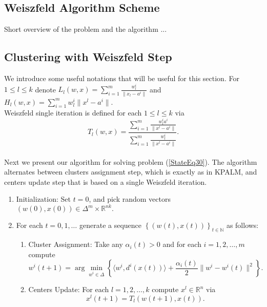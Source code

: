 \documentclass[11pt]{article}
\numberwithin{equation}{section}
\begin{document}
\subsection{Weiszfeld Algorithm Scheme}
Short overview of the problem and the algorithm ...

\subsection{Clustering with Weiszfeld Step}

We introduce some useful notations that will be useful for this section. 
For $1 \leq l \leq k$ denote $L_l(w,x)= \sum\limits_{i=1}^{m}\frac{w^i_l}{\|x_l - a^i\|}$ and $H_l(w,x)= \sum\limits_{i=1}^{m} w^i_l \|x^l - a^i\|$. \\
Weiszfeld single iteration is defined for each $1 \leq l \leq k$ via
\begin{equation}
T_l(w,x) = \frac{\sum\limits_{i=1}^{m}\frac{w^i_la^i}{\|x^l - a^i\|}}{\sum\limits_{i=1}^{m}\frac{w^i_l}{\|x^l - a^i\|}} . \label{StateEq31}
\end{equation} \\
Next we present our algorithm for solving problem (\ref{StateEq30}).  The algorithm alternates between clusters assignment step, which is exactly as in KPALM, and centers update step that is based on a single Weiszfeld iteration.

\begin{enumerate}[(1)]
	\item Initialization: Set $t=0$, and pick random vectors $(w(0),x(0)) \in \Delta^m \times \mathbb{R}^{nk} .$

	\item For each $t=0,1, \ldots$ generate a sequence $\left\lbrace(w(t),x(t))\right\rbrace_{t \in \mathbb{N}}$ as follows:
	\begin{enumerate}[(2.1)]
		\item Cluster Assignment: Take any $\alpha_i(t) > 0$ and for each $i=1, 2, \ldots ,m$ compute
		\begin{equation}
			w^i(t+1) = \arg\min\limits_{w^i \in \Delta} \left\lbrace \langle w^i , d^i(x(t)) \rangle + \frac{\alpha_i(t)}{2} \|w^i - w^i(t)\|^2 \right\rbrace . \label{StateEq32}
		\end{equation}
		
		\item Centers Update: For each $l=1, 2, \ldots ,k$ compute $x^l \in \mathbb{R}^n$ via
		\begin{equation}
			x^l(t+1) = T_l(w(t+1),x(t)) . \label{StateEq33}
		\end{equation}
	\end{enumerate}
\end{enumerate}
\end{document}
